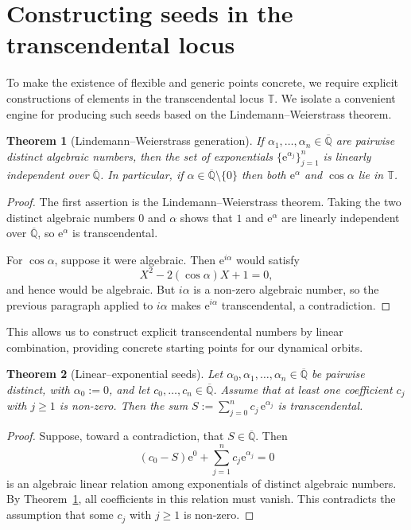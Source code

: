 \documentclass[11pt,a4paper]{article}
\theoremstyle{plain}
\newtheorem{theorem}{Theorem}[section]
\theoremstyle{definition}
\newcommand{\e}{\mathrm{e}}
\newcommand{\Alg}{\overline{\mathbb{Q}}}
\newcommand{\trans}{\mathbb{T}}
\newcommand{\Tc}{\trans}
\begin{document}
\section{Constructing seeds in the transcendental locus}\label{sec:constructing-seeds}

To make the existence of flexible and generic points concrete, we require explicit constructions of elements in the transcendental locus $\Tc$. We isolate a convenient engine for producing such seeds based on the Lindemann--Weierstrass theorem.

\begin{theorem}[Lindemann--Weierstrass generation]\label{thm:lindemann-weierstrass}
	If $\alpha_1,\dots,\alpha_n\in\Alg$ are pairwise distinct algebraic numbers, then the set of exponentials $\{\e^{\alpha_j}\}_{j=1}^n$ is linearly independent over $\Alg$.
	In particular, if $\alpha\in\Alg\setminus\{0\}$ then both $\e^{\alpha}$ and $\cos\alpha$ lie in $\Tc$.
\end{theorem}
\begin{proof}
	The first assertion is the Lindemann--Weierstrass theorem. Taking the two distinct algebraic numbers $0$ and $\alpha$ shows that $1$ and $\e^\alpha$ are linearly independent over $\Alg$, so $\e^\alpha$ is transcendental.
	
	For $\cos\alpha$, suppose it were algebraic. Then $\e^{i\alpha}$ would satisfy
	\[
		X^2-2(\cos\alpha)X+1=0,
	\]
	and hence would be algebraic. But $i\alpha$ is a non-zero algebraic number, so the previous paragraph applied to $i\alpha$ makes $\e^{i\alpha}$ transcendental, a contradiction.
\end{proof}

This allows us to construct explicit transcendental numbers by linear combination, providing concrete starting points for our dynamical orbits.

\begin{theorem}[Linear–exponential seeds]\label{thm:linear-exponential-seed}
	Let $\alpha_0,\alpha_1,\dots,\alpha_n\in\Alg$ be pairwise distinct, with $\alpha_0:=0$, and let $c_0,\dots,c_n\in\Alg$. Assume that at least one coefficient $c_j$ with $j\ge1$ is non-zero. Then the sum
	\(
	S:=\sum_{j=0}^n c_j\,\e^{\alpha_j}
	\)
	is transcendental.
\end{theorem}
\begin{proof}
	Suppose, toward a contradiction, that $S\in\Alg$. Then
	\[
		(c_0-S)\e^0+\sum_{j=1}^n c_j\e^{\alpha_j}=0
	\]
	is an algebraic linear relation among exponentials of distinct algebraic numbers. By Theorem~\ref{thm:lindemann-weierstrass}, all coefficients in this relation must vanish. This contradicts the assumption that some $c_j$ with $j\ge1$ is non-zero.
\end{proof}
\end{document}
